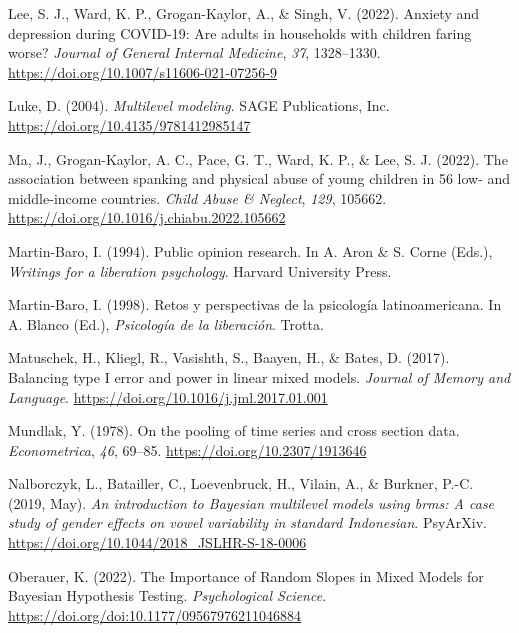 \documentclass[
  letterpaper,
  DIV=11,
  numbers=noendperiod]{scrreprt}
\newlength{\cslhangindent}
\newlength{\cslentryspacingunit} %
\newenvironment{CSLReferences}[2] %
 {%
  \setlength{\parindent}{0pt}
  \ifodd #1
  \let\oldpar\par
  \def\par{\hangindent=\cslhangindent\oldpar}
  \fi
  \setlength{\parskip}{#2\cslentryspacingunit}
 }%
 {}
\begin{document}
\begin{CSLReferences}{1}{0}
\leavevmode{}%
Lee, S. J., Ward, K. P., Grogan-Kaylor, A., \& Singh, V. (2022). Anxiety
and depression during {COVID-19}: Are adults in households with children
faring worse? \emph{Journal of General Internal Medicine}, \emph{37},
1328--1330. \url{https://doi.org/10.1007/s11606-021-07256-9}

\leavevmode{}%
Luke, D. (2004). \emph{Multilevel modeling}. SAGE Publications, Inc.
\url{https://doi.org/10.4135/9781412985147}

\leavevmode{}%
Ma, J., Grogan-Kaylor, A. C., Pace, G. T., Ward, K. P., \& Lee, S. J.
(2022). {The association between spanking and physical abuse of young
children in 56 low- and middle-income countries}. \emph{Child Abuse \&
Neglect}, \emph{129}, 105662.
\url{https://doi.org/10.1016/j.chiabu.2022.105662}

\leavevmode{}%
Martin-Baro, I. (1994). Public opinion research. In A. Aron \& S. Corne
(Eds.), \emph{Writings for a liberation psychology}. Harvard University
Press.

\leavevmode{}%
Martin-Baro, I. (1998). {Retos y perspectivas de la psicología
latinoamericana}. In A. Blanco (Ed.), \emph{Psicología de la
liberación}. Trotta.

\leavevmode{}%
Matuschek, H., Kliegl, R., Vasishth, S., Baayen, H., \& Bates, D.
(2017). Balancing type {I} error and power in linear mixed models.
\emph{Journal of Memory and Language}.
\url{https://doi.org/10.1016/j.jml.2017.01.001}

\leavevmode{}%
Mundlak, Y. (1978). On the pooling of time series and cross section
data. \emph{Econometrica}, \emph{46}, 69--85.
\url{https://doi.org/10.2307/1913646}

\leavevmode{}%
Nalborczyk, L., Batailler, C., Loevenbruck, H., Vilain, A., \& Burkner,
P.-C. (2019, May). \emph{An introduction to {B}ayesian multilevel models
using brms: A case study of gender effects on vowel variability in
standard {I}ndonesian}. PsyArXiv.
\url{https://doi.org/10.1044/2018_JSLHR-S-18-0006}

\leavevmode{}%
Oberauer, K. (2022). {The Importance of Random Slopes in Mixed Models
for Bayesian Hypothesis Testing}. \emph{Psychological Science}.
\url{https://doi.org/doi:10.1177/09567976211046884}


\end{CSLReferences}
\end{document}
